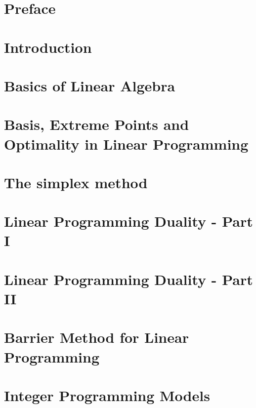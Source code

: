 \documentclass{bookest}
\begin{document}
	

	\tableofcontents

	\chapter*{Preface}
	
	
	\chapter{Introduction} \label{chapter_1}
	
	
	\chapter{Basics of Linear Algebra} \label{chapter_2}
	
	
	\chapter{Basis, Extreme Points and Optimality in Linear Programming} \label{chapter_3}
		 
	
	\chapter{The simplex method} \label{chapter_4}
		
		
	\chapter{Linear Programming Duality - Part I} \label{chapter_5}
		
	
	\chapter{Linear Programming Duality - Part II} \label{chapter_6}
	
	
	\chapter{Barrier Method for Linear Programming} \label{chapter_7}
	
	
	\chapter{Integer Programming Models} \label{chapter_8}
	
	
\end{document}
